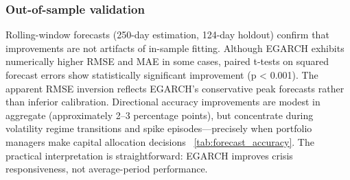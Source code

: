 \documentclass{article}
\begin{document}
\subsubsection{Out-of-sample validation}

Rolling-window forecasts (250-day estimation, 124-day holdout) confirm that improvements are not artifacts of in-sample fitting. Although EGARCH exhibits numerically higher RMSE and MAE in some cases, paired t-tests on squared forecast errors show statistically significant improvement (p < 0.001). The apparent RMSE inversion reflects EGARCH’s conservative peak forecasts rather than inferior calibration. Directional accuracy improvements are modest in aggregate (approximately 2–3 percentage points), but concentrate during volatility regime transitions and spike episodes—precisely when portfolio managers make capital allocation decisions ~\ref{tab:forecast_accuracy}. The practical interpretation is straightforward: EGARCH improves crisis responsiveness, not average-period performance.\newline
\end{document}
